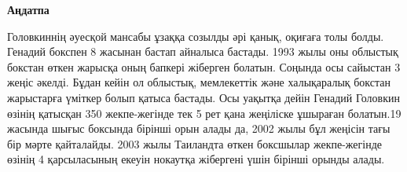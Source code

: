 \newpage
\pagestyle{plain}

{
\begin{center}
    \Large
    \textbf{Аңдатпа}
\end{center}
Головкиннің әуесқой мансабы ұзаққа созылды әрі қанық, оқиғаға толы болды. Генадий бокспен 8 жасынан бастап айналыса бастады. 1993 жылы оны облыстық бокстан өткен жарысқа оның бапкері жіберген болатын. Соңында осы сайыстан 3 жеңіс әкелді. Бұдан кейін ол облыстық, мемлекеттік және халықаралық бокстан жарыстарға үміткер болып қатыса бастады. Осы уақытқа дейін Генадий Головкин өзінің қатысқан 350 жекпе-жегінде тек 5 рет қана жеңіліске ұшыраған болатын.19 жасында шығыс боксында бірінші орын алады да, 2002 жылы бұл жеңісін тағы бір мәрте қайталайды. 2003 жылы Таиландта өткен боксшылар жекпе-жегінде өзінің 4 қарсыласының екеуін нокаутқа жібергені үшін бірінші орынды алады.
}